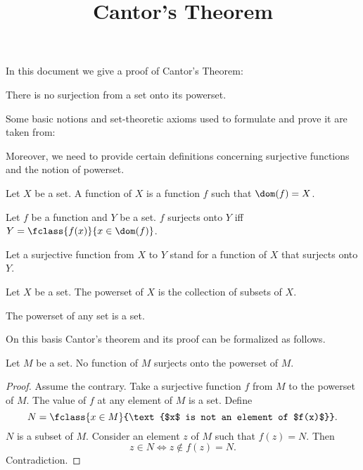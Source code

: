 \documentclass{article}
\title{Cantor's Theorem}
\author{}
\date{}
\begin{document}
  \maketitle

  In this document we give a proof of Cantor's Theorem:

  \begin{theorem*}
    There is no surjection from a set onto its powerset.
  \end{theorem*}

  Some basic notions and set-theoretic axioms used to formulate and prove it are
  taken from:

  \begin{forthel}
  \end{forthel}

  Moreover, we need to provide certain definitions concerning surjective
  functions and the notion of powerset.

  \begin{forthel}
    \begin{definition*}
      Let $X$ be a set.
      A function of $X$ is a function $f$ such that $\dom(f) = X$.
    \end{definition*}

    \begin{definition*}
      Let $f$ be a function and $Y$ be a set.
      $f$ surjects onto $Y$ iff $Y = \fclass{f(x)}{x \in \dom(f)}$.
    \end{definition*}

    Let a surjective function from $X$ to $Y$ stand for a function of $X$ that
    surjects onto $Y$.

    \begin{definition*}
      Let $X$ be a set.
      The powerset of $X$ is the collection of subsets of $X$.
    \end{definition*}

    \begin{axiom*}
      The powerset of any set is a set.
    \end{axiom*}
  \end{forthel}

  On this basis Cantor's theorem and its proof can be formalized as follows.

  \begin{forthel}
    \begin{theorem*}[Cantor]
      Let $M$ be a set.
      No function of $M$ surjects onto the powerset of $M$.
    \end{theorem*}
    \begin{proof}
      Assume the contrary.
      Take a surjective function $f$ from $M$ to the powerset of $M$.
      The value of $f$ at any element of $M$ is a set.
      Define \[ N = \fclass{x \in M}{\text{$x$ is not an element of $f(x)$}}. \]
      $N$ is a subset of $M$.
      Consider an element $z$ of $M$ such that $f(z) = N$.
      Then \[ z \in N \iff z \notin f(z) = N. \]
      Contradiction.
    \end{proof}
  \end{forthel}
\end{document}
